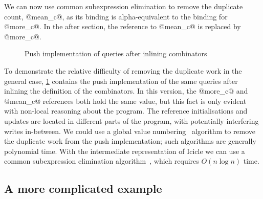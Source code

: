 We can now use common subexpression elimination to remove the duplicate count, @mean_c@, as its binding is alpha-equivalent to the binding for @more_c@.
In the after section, the reference to @mean_c@ is replaced by @more_c@.

\begin{figure}
\caption{Push implementation of queries after inlining combinators}
\label{icicle:fig:core:push_query}
\end{figure}

To demonstrate the relative difficulty of removing the duplicate work in the general case, \cref{icicle:fig:core:push_query} contains the push implementation of the same queries after inlining the definition of the combinators.
In this version, the @more_c@ and @mean_c@ references both hold the same value, but this fact is only evident with non-local reasoning about the program.
The reference initialisations and updates are located in different parts of the program, with potentially interfering writes in-between.
We could use a global value numbering~\citep{gulwani2004polynomial} algorithm to remove the duplicate work from the push implementation; such algorithms are generally polynomial time.
With the intermediate representation of Icicle we can use a common subexpression elimination algorithm~\cite{chitil1997common}, which requires $O(n \log n)$ time.

\subsection{A more complicated example}

